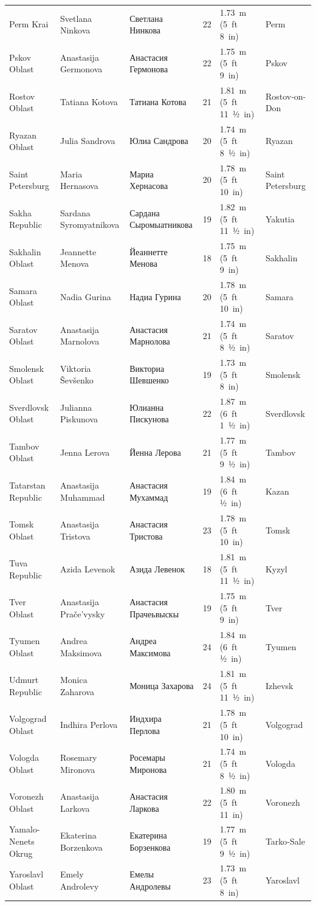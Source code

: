 \documentclass{article}
\begin{document}
\begin{tabular}{llllll}
Perm Krai & Svetlana Ninkova & Светлана Нинкова & 22 & 1.73 m (5 ft 8 in) & Perm \\
Pskov Oblast & Anastasija Germonova & Анастасия Гермонова & 22 & 1.75 m (5 ft 9 in) & Pskov \\
Rostov Oblast & Tatiana Kotova & Татиана Котова & 21 & 1.81 m (5 ft 11 1⁄2 in) & Rostov-on-Don \\
Ryazan Oblast & Julia Sandrova & Юлиа Сандрова & 20 & 1.74 m (5 ft 8 1⁄2 in) & Ryazan \\
Saint Petersburg & Maria Hernasova & Мариа Хернасова & 20 & 1.78 m (5 ft 10 in) & Saint Petersburg \\
Sakha Republic & Sardana Syromyatnikova & Сардана Сыромыатникова & 19 & 1.82 m (5 ft 11 1⁄2 in) & Yakutia \\
Sakhalin Oblast & Jeannette Menova & Йеаннетте Менова & 18 & 1.75 m (5 ft 9 in) & Sakhalin \\
Samara Oblast & Nadia Gurina & Надиа Гурина & 20 & 1.78 m (5 ft 10 in) & Samara \\
Saratov Oblast & Anastasija Marnolova & Анастасия Марнолова & 21 & 1.74 m (5 ft 8 1⁄2 in) & Saratov \\
Smolensk Oblast & Viktoria Ševšenko & Викториа Шевшенко & 19 & 1.73 m (5 ft 8 in) & Smolensk \\
Sverdlovsk Oblast & Julianna Piskunova & Юлианна Пискунова & 22 & 1.87 m (6 ft 1 1⁄2 in) & Sverdlovsk \\
Tambov Oblast & Jenna Lerova & Йенна Лерова & 21 & 1.77 m (5 ft 9 1⁄2 in) & Tambov \\
Tatarstan Republic & Anastasija Muhammad & Анастасия Мухаммад & 19 & 1.84 m (6 ft 1⁄2 in) & Kazan \\
Tomsk Oblast & Anastasija Tristova & Анастасия Тристова & 23 & 1.78 m (5 ft 10 in) & Tomsk \\
Tuva Republic & Azida Levenok & Азида Левенок & 18 & 1.81 m (5 ft 11 1⁄2 in) & Kyzyl \\
Tver Oblast & Anastasija Prače’vysky & Анастасия Прачеьвыскы & 19 & 1.75 m (5 ft 9 in) & Tver \\
Tyumen Oblast & Andrea Maksimova & Андреа Максимова & 24 & 1.84 m (6 ft 1⁄2 in) & Tyumen \\
Udmurt Republic & Monica Zaharova & Моница Захарова & 24 & 1.81 m (5 ft 11 1⁄2 in) & Izhevsk \\
Volgograd Oblast & Indhira Perlova & Индхира Перлова & 21 & 1.78 m (5 ft 10 in) & Volgograd \\
Vologda Oblast & Rosemary Mironova & Росемары Миронова & 21 & 1.74 m (5 ft 8 1⁄2 in) & Vologda \\
Voronezh Oblast & Anastasija Larkova & Анастасия Ларкова & 22 & 1.80 m (5 ft 11 in) & Voronezh \\
Yamalo-Nenets Okrug & Ekaterina Borzenkova & Екатерина Борзенкова & 19 & 1.77 m (5 ft 9 1⁄2 in) & Tarko-Sale \\
Yaroslavl Oblast & Emely Androlevy & Емелы Андролевы & 23 & 1.73 m (5 ft 8 in) & Yaroslavl \\
\bottomrule
\end{tabular}
\end{document}
